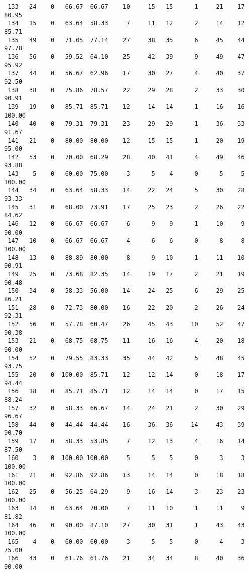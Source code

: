 \begin{verbatim}
 133   24    0   66.67  66.67    10     15   15      1     21    17    80.95
 134   15    0   63.64  58.33     7     11   12      2     14    12    85.71
 135   49    0   71.05  77.14    27     38   35      6     45    44    97.78
 136   56    0   59.52  64.10    25     42   39      9     49    47    95.92
 137   44    0   56.67  62.96    17     30   27      4     40    37    92.50
 138   38    0   75.86  78.57    22     29   28      2     33    30    90.91
 139   19    0   85.71  85.71    12     14   14      1     16    16   100.00
 140   40    0   79.31  79.31    23     29   29      1     36    33    91.67
 141   21    0   80.00  80.00    12     15   15      1     20    19    95.00
 142   53    0   70.00  68.29    28     40   41      4     49    46    93.88
 143    5    0   60.00  75.00     3      5    4      0      5     5   100.00
 144   34    0   63.64  58.33    14     22   24      5     30    28    93.33
 145   31    0   68.00  73.91    17     25   23      2     26    22    84.62
 146   12    0   66.67  66.67     6      9    9      1     10     9    90.00
 147   10    0   66.67  66.67     4      6    6      0      8     8   100.00
 148   13    0   88.89  80.00     8      9   10      1     11    10    90.91
 149   25    0   73.68  82.35    14     19   17      2     21    19    90.48
 150   34    0   58.33  56.00    14     24   25      6     29    25    86.21
 151   28    0   72.73  80.00    16     22   20      2     26    24    92.31
 152   56    0   57.78  60.47    26     45   43     10     52    47    90.38
 153   21    0   68.75  68.75    11     16   16      4     20    18    90.00
 154   52    0   79.55  83.33    35     44   42      5     48    45    93.75
 155   20    0  100.00  85.71    12     12   14      0     18    17    94.44
 156   18    0   85.71  85.71    12     14   14      0     17    15    88.24
 157   32    0   58.33  66.67    14     24   21      2     30    29    96.67
 158   44    0   44.44  44.44    16     36   36     14     43    39    90.70
 159   17    0   58.33  53.85     7     12   13      4     16    14    87.50
 160    3    0  100.00 100.00     5      5    5      0      3     3   100.00
 161   21    0   92.86  92.86    13     14   14      0     18    18   100.00
 162   25    0   56.25  64.29     9     16   14      3     23    23   100.00
 163   14    0   63.64  70.00     7     11   10      1     11     9    81.82
 164   46    0   90.00  87.10    27     30   31      1     43    43   100.00
 165    4    0   60.00  60.00     3      5    5      0      4     3    75.00
 166   43    0   61.76  61.76    21     34   34      8     40    36    90.00

\end{verbatim}
